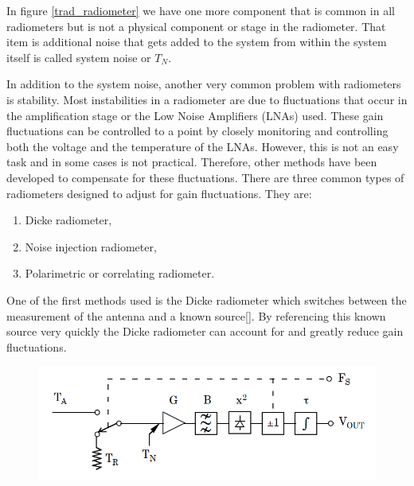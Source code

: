 In figure \ref{trad_radiometer} we have one more component that is common in all radiometers but is not a physical component or stage in the radiometer.  That item is additional noise that gets added to the system from within the system itself is called system noise or $T_{N}$.

In addition to the system noise, another very common problem with radiometers is stability.  Most instabilities in a radiometer are due to fluctuations that occur in the amplification stage or the Low Noise Amplifiers (LNAs) used. These gain fluctuations can be controlled to a point by closely monitoring and controlling both the voltage and the temperature of the LNAs. However, this is not an easy task and in some cases is not practical.  Therefore, other methods have been developed to compensate for these fluctuations.  There are three common types of radiometers designed to adjust for gain fluctuations.  They are:

\begin{enumerate}
\item Dicke radiometer,
\item Noise injection radiometer,
\item Polarimetric or correlating radiometer.
\end{enumerate}


One of the first methods used is the Dicke radiometer which switches between the measurement of the antenna and a known source[\cite{Dicke}].  By referencing this known source very quickly the Dicke radiometer can account for and greatly reduce gain fluctuations.  

{\begin{figure}[h!tb] 
\centering
\includegraphics[width=\textwidth]{Images/Dicke_block.png}
\label{dicke_radiometer}
\end{figure}
}

